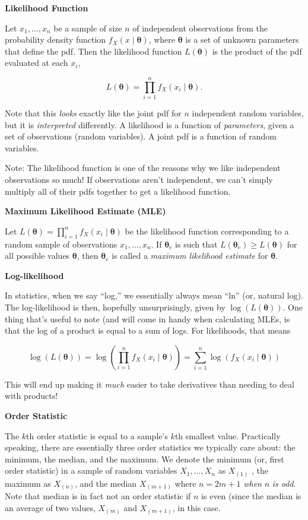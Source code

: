 \documentclass[
  letterpaper,
  DIV=11,
  numbers=noendperiod]{scrreprt}
\begin{document}
\textbf{Likelihood Function}

Let \(x_1, \dots, x_n\) be a sample of size \(n\) of independent
observations from the probability density function
\(f_X(x \mid \boldsymbol{\theta})\), where \(\boldsymbol{\theta}\) is a
set of unknown parameters that define the pdf. Then the likelihood
function \(L(\boldsymbol{\theta})\) is the product of the pdf evaluated
at each \(x_i\),

\[
L(\boldsymbol{\theta}) = \prod_{i = 1}^n f_X(x_i \mid \boldsymbol{\theta}).
\]

Note that this \emph{looks} exactly like the joint pdf for \(n\)
independent random variables, but it is \emph{interpreted} differently.
A likelihood is a function of \emph{parameters}, given a set of
observations (random variables). A joint pdf is a function of random
variables.

Note: The likelihood function is one of the reasons why we like
independent observations so much! If observations aren't independent, we
can't simply multiply all of their pdfs together to get a likelihood
function.

\textbf{Maximum Likelihood Estimate (MLE)}

Let
\(L(\boldsymbol{\theta}) = \prod_{i = 1}^n f_X(x_i \mid \boldsymbol{\theta})\)
be the likelihood function corresponding to a random sample of
observations \(x_1, \dots, x_n\). If \(\boldsymbol{\theta}_e\) is such
that \(L(\boldsymbol{\theta}_e) \geq L(\boldsymbol{\theta})\) for all
possible values \(\boldsymbol{\theta}\), then \(\boldsymbol{\theta}_e\)
is called a \emph{maximum likelihood estimate} for
\(\boldsymbol{\theta}\).

\textbf{Log-likelihood}

In statistics, when we say ``log,'' we essentially always mean ``ln''
(or, natural log). The log-likelihood is then, hopefully unsurprisingly,
given by \(\log(L(\boldsymbol{\theta}))\). One thing that's useful to
note (and will come in handy when calculating MLEs, is that the log of a
product is equal to a sum of logs. For likelihoods, that means

\[
\log(L(\boldsymbol{\theta})) = \log \left(\prod_{i = 1}^n f_X(x_i \mid \boldsymbol{\theta})\right) = \sum_{i = 1}^n \log(f_X(x_i \mid \boldsymbol{\theta}))
\]

This will end up making it \emph{much} easier to take derivatives than
needing to deal with products!

\textbf{Order Statistic}

The \(k\)th order statistic is equal to a sample's \(k\)th smallest
value. Practically speaking, there are essentially three order
statistics we typically care about: the minimum, the median, and the
maximum. We denote the minimum (or, first order statistic) in a sample
of random variables \(X_1, \dots, X_n\) as \(X_{(1)}\) , the maximum as
\(X_{(n)}\), and the median \(X_{(m+1)}\) where \(n = 2m + 1\)
\emph{when} \(n\) \emph{is odd}. Note that median is in fact not an
order statistic if \(n\) is even (since the median is an average of two
values, \(X_{(m)}\) and \(X_{(m+1)}\), in this case.
\end{document}
